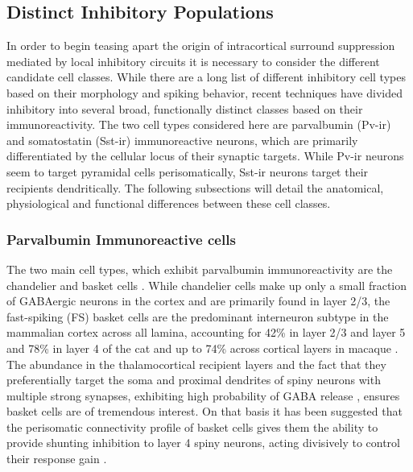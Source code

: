 \subsection{Distinct Inhibitory Populations}

In order to begin teasing apart the origin of intracortical surround
suppression mediated by local inhibitory circuits it is necessary to
consider the different candidate cell classes. While there are a long
list of different inhibitory cell types based on their morphology and
spiking behavior, recent techniques have divided inhibitory into
several broad, functionally distinct classes based on their
immunoreactivity. The two cell types considered here are parvalbumin
(Pv-ir) and somatostatin (Sst-ir) immunoreactive neurons, which are
primarily differentiated by the cellular locus of their synaptic
targets. While Pv-ir neurons seem to target pyramidal cells
perisomatically, Sst-ir neurons target their recipients
dendritically. The following subsections will detail the anatomical,
physiological and functional differences between these cell classes.

\subsubsection{Parvalbumin Immunoreactive cells}

The two main cell types, which exhibit parvalbumin immunoreactivity
are the chandelier and basket cells \citep{Binzegger2004}. While
chandelier cells make up only a small fraction of GABAergic neurons in
the cortex and are primarily found in layer 2/3, the fast-spiking (FS)
basket cells are the predominant interneuron subtype in the mammalian
cortex across all lamina, accounting for 42\% in layer 2/3 and layer 5
and 78\% in layer 4 of the cat \citep{Hogan1992,Huxlin2001} and up to
74\% across cortical layers in macaque \citep{VanBrederode1990}. The
abundance in the thalamocortical recipient layers and the fact that
they preferentially target the soma and proximal dendrites of spiny
neurons with multiple strong synapses, exhibiting high probability of
GABA release \citep{Freund2007,Markram2004}, ensures basket cells are
of tremendous interest. On that basis it has been suggested that the
perisomatic connectivity profile of basket cells gives them the
ability to provide shunting inhibition to layer 4 spiny neurons,
acting divisively to control their response gain \citep{Wilson2012}.

